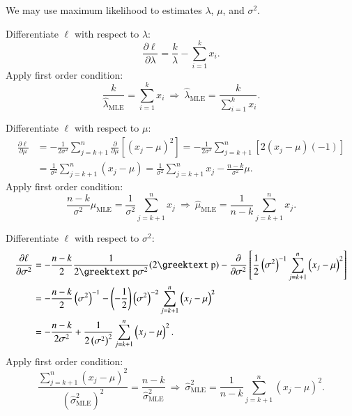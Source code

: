 \documentclass[a4paper,11pt,svgnames,dvipsnames]{article}
\renewcommand{\pi}{\text{\textrm{\greektext p}}}
\newcommand{\wrt}{with respect to }
\newcommand{\mle}[1]{\widehat{#1}_\text{MLE}}
\newcommand{\pp}[1]{\frac{\partial}{\partial#1}}
\begin{document}
We may use maximum likelihood to estimates $\lambda$, $\mu$, and $\sigma^2$.

Differentiate $\ell$ \wrt $\lambda$:
\begin{equation*}
    \frac{\partial\ell}{\partial\lambda} = \frac{k}{\lambda} - \sum_{i=1}^k x_i.
\end{equation*}
Apply first order condition:
\begin{equation}\label{foc1}
    \frac{k}{\mle{\lambda}} = \sum_{i=1}^k x_i\ \Longrightarrow\ \mle{\lambda} = \frac{k}{\sum_{i=1}^k x_i}.
\end{equation}

Differentiate $\ell$ \wrt $\mu$:
\begin{equation*}
    \begin{aligned}
        \frac{\partial\ell}{\partial\mu}
        & = -\frac{1}{2\sigma^2} \sum_{j=k+1}^n \pp{\mu} \left[ \left( x_j - \mu \right)^2 \right]
        = -\frac{1}{2\sigma^2} \sum_{j=k+1}^n \left[ 2\left( x_j - \mu \right)(-1) \right]          \\
        & = \frac{1}{\sigma^2}\sum_{j=k+1}^n \left( x_j-\mu \right)
        = \frac{1}{\sigma^2}\sum_{j=k+1}^n x_j - \frac{n-k}{\sigma^2} \mu.
    \end{aligned}
\end{equation*}
Apply first order condition:
\begin{equation}\label{foc2}
    \frac{n-k}{\sigma^2}\mle{\mu} = \frac{1}{\sigma^2}\sum_{j=k+1}^n x_j\ \Longrightarrow\ \mle{\mu} = \frac{1}{n-k}\sum_{j=k+1}^n x_j.
\end{equation}

Differentiate $\ell$ \wrt $\sigma^2$:
\begin{equation*}
    \begin{aligned}
        \frac{\partial\ell}{\partial\sigma^2}
        & = -\frac{n-k}{2}\frac{1}{2\pi\sigma^2}(2\pi)-\pp{\sigma^2} \left[ \frac{1}{2}\left( \sigma^2 \right)^{-1} \sum_{j=k+1}^n \left( x_j - \mu \right)^2 \right] \\
        & = -\frac{n-k}{2} \left( \sigma^2 \right)^{-1} - \left( -\frac{1}{2} \right) \left( \sigma^2 \right)^{-2} \sum_{j=k+1}^n \left( x_j - \mu \right)^2          \\
        & = -\frac{n-k}{2\sigma^2} + \frac{1}{2\left( \sigma^2 \right)^2} \sum_{j=k+1}^n \left( x_j-\mu \right)^2.
    \end{aligned}
\end{equation*}
Apply first order condition:
\begin{equation}\label{foc3}
    \frac{\sum_{j=k+1}^n \left( x_j - \mu \right)^2}{\left( \mle{\sigma}^2 \right)^2} = \frac{n-k}{\mle{\sigma}^2}\ \Longrightarrow\ \mle{\sigma}^2 = \frac{1}{n-k} \sum_{j=k+1}^n \left( x_j-\mu \right)^2.
\end{equation}
\end{document}
